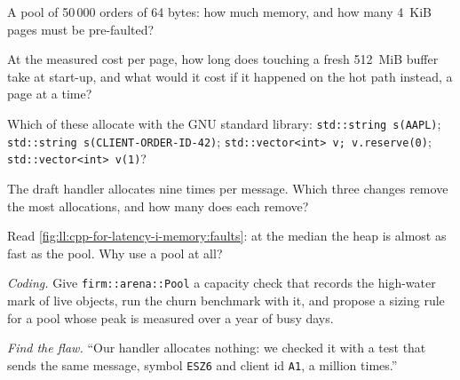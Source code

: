 \begin{exercise}[$\star$]\label{exo:ll:cpp-for-latency-i-memory:2}
A pool of 50\,000 orders of 64 bytes: how much memory, and how many 4~KiB pages must be pre-faulted?
\end{exercise}

\begin{exercise}[$\star$]\label{exo:ll:cpp-for-latency-i-memory:3}
At the measured cost per page, how long does touching a fresh 512~MiB buffer take at start-up, and what would it cost if
it happened on the hot path instead, a page at a time?
\end{exercise}

\begin{exercise}[$\star\star$]\label{exo:ll:cpp-for-latency-i-memory:4}
Which of these allocate with the GNU standard library: \texttt{std::string s(\textquotedbl{}AAPL\textquotedbl{})};
\texttt{std::string s(\textquotedbl{}CLIENT-ORDER-ID-42\textquotedbl{})}; \texttt{std::vector<int> v; v.reserve(0)};
\texttt{std::vector<int> v(1)}?
\end{exercise}

\begin{exercise}[$\star\star$]\label{exo:ll:cpp-for-latency-i-memory:5}
The draft handler allocates nine times per message. Which three changes remove the most allocations, and how many does each
remove?
\end{exercise}

\begin{exercise}[$\star\star$]\label{exo:ll:cpp-for-latency-i-memory:6}
Read \cref{fig:ll:cpp-for-latency-i-memory:faults}: at the median the heap is almost as fast as the pool. Why use a pool
at all?
\end{exercise}

\begin{exercise}[$\star\star\star$]\label{exo:ll:cpp-for-latency-i-memory:7}
\emph{Coding.} Give \texttt{firm::arena::Pool} a capacity check that records the high-water mark of live objects, run the
churn benchmark with it, and propose a sizing rule for a pool whose peak is measured over a year of busy days.
\end{exercise}

\begin{exercise}[$\star\star\star$]\label{exo:ll:cpp-for-latency-i-memory:8}
\emph{Find the flaw.} ``Our handler allocates nothing: we checked it with a test that sends the same message, symbol
\texttt{ESZ6} and client id \texttt{A1}, a million times.''
\end{exercise}

